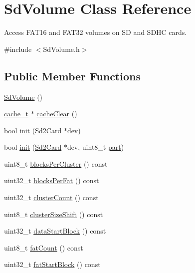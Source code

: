 \hypertarget{class_sd_volume}{}\section{Sd\+Volume Class Reference}
\label{class_sd_volume}


Access F\+A\+T16 and F\+A\+T32 volumes on SD and S\+D\+HC cards.  




{\ttfamily \#include $<$Sd\+Volume.\+h$>$}

\subsection*{Public Member Functions}
\begin{DoxyCompactItemize}
\item 
\hyperlink{class_sd_volume_a30d4489087fbdce20b8fe1a624dbe658}{Sd\+Volume} ()
\item 
\hyperlink{unioncache__t}{cache\+\_\+t} $\ast$ \hyperlink{class_sd_volume_adaecef65fdf94d323597a461eb641f5e}{cache\+Clear} ()
\item 
bool \hyperlink{class_sd_volume_a0ac221eda119ddccae8ac6bc20a4b12d}{init} (\hyperlink{class_sd2_card}{Sd2\+Card} $\ast$dev)
\item 
bool \hyperlink{class_sd_volume_ae820ee8d9ea7ed01ce72ae3508a63cbf}{init} (\hyperlink{class_sd2_card}{Sd2\+Card} $\ast$dev, uint8\+\_\+t \hyperlink{_sd_fat_structs_8h_aa65f87792f271fc6cfa70980af6ac3dd}{part})
\item 
uint8\+\_\+t \hyperlink{class_sd_volume_affab4c57c98e41ee55b21c87f814804b}{blocks\+Per\+Cluster} () const 
\item 
uint32\+\_\+t \hyperlink{class_sd_volume_a87ed6542db9642ffa106def897a368c6}{blocks\+Per\+Fat} () const 
\item 
uint32\+\_\+t \hyperlink{class_sd_volume_a323adfb5ac395b769f30c31ce2618f22}{cluster\+Count} () const 
\item 
uint8\+\_\+t \hyperlink{class_sd_volume_a50c8e198feb63b0ca26737f91bd3e139}{cluster\+Size\+Shift} () const 
\item 
uint32\+\_\+t \hyperlink{class_sd_volume_a99ca71035785948c42ade0863f91c9ab}{data\+Start\+Block} () const 
\item 
uint8\+\_\+t \hyperlink{class_sd_volume_a5d4307584ef14e4a2fef85b4954b1aa2}{fat\+Count} () const 
\item 
uint32\+\_\+t \hyperlink{class_sd_volume_a9032ec5d3323ee67477c6bbf39821415}{fat\+Start\+Block} () const 

\end{DoxyCompactItemize}
